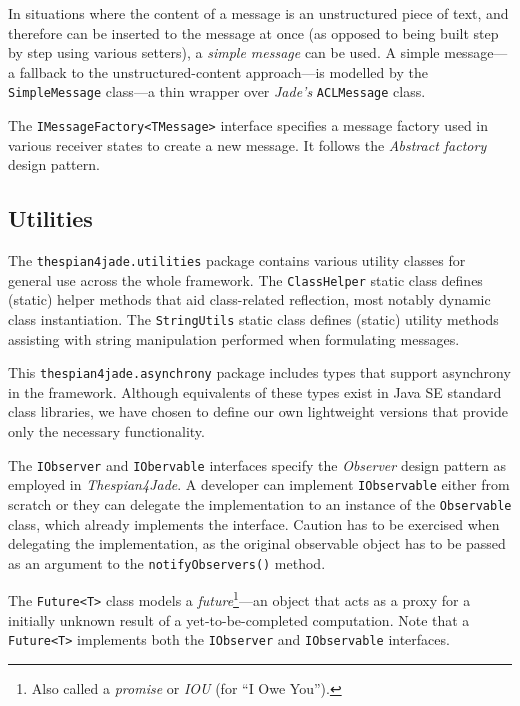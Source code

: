 In situations where the content of a message is an unstructured piece of text, and therefore can be inserted to the message at once (as opposed to being built step by step using various setters), a \textit{simple message} can be used.
A simple message---a fallback to the unstructured-content approach---is modelled by the \texttt{SimpleMessage} class---a thin wrapper over \textit{Jade's} \texttt{ACLMessage} class.

The \texttt{IMessageFactory<TMessage>} interface specifies a message factory used in various receiver states to create a new message.
It follows the \textit{Abstract factory} design pattern.

\subsection{Utilities}

The \texttt{thespian4jade.utilities} package contains various utility classes for general use across the whole framework.
The \texttt{ClassHelper} static class defines (static) helper methods that aid class-related reflection, most notably dynamic class instantiation.
The \texttt{StringUtils} static class defines (static) utility methods assisting with string manipulation performed when formulating messages.

This \texttt{thespian4jade.asynchrony} package includes types that support asynchrony in the framework.
Although equivalents of these types exist in Java SE standard class libraries, we have chosen to define our own lightweight versions that provide only the necessary functionality. 

The \texttt{IObserver} and \texttt{IObervable} interfaces specify the \textit{Observer} design pattern as employed in \textit{Thespian4Jade}.
A developer can implement \texttt{IObservable} either from scratch or they can delegate the implementation to an instance of the \texttt{Observable} class, which already implements the interface.
Caution has to be exercised when delegating the implementation, as the original observable object has to be passed as an argument to the \texttt{notifyObservers()} method.

The \texttt{Future<T>} class models a \textit{future}\footnote{Also called a \textit{promise} or \textit{IOU} (for ``I Owe You'').}---an object that acts as a proxy for a initially unknown result of a yet-to-be-completed computation.
Note that a \texttt{Future<T>} implements both the \texttt{IObserver} and \texttt{IObservable} interfaces.

